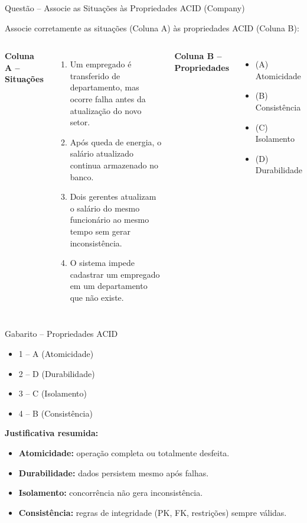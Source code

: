 \documentclass{beamer}
\begin{document}
\begin{frame}{Questão – Associe as Situações às Propriedades ACID (Company)}

Associe corretamente as situações (Coluna A) às propriedades ACID (Coluna B):

\begin{columns}[T]

\textbf{Coluna A – Situações}

\begin{enumerate}
    \item Um empregado é transferido de departamento, mas ocorre falha antes da atualização do novo setor.
    \item Após queda de energia, o salário atualizado continua armazenado no banco.
    \item Dois gerentes atualizam o salário do mesmo funcionário ao mesmo tempo sem gerar inconsistência.
    \item O sistema impede cadastrar um empregado em um departamento que não existe.
\end{enumerate}

\textbf{Coluna B – Propriedades}

\begin{itemize}
    \item (A) Atomicidade
    \item (B) Consistência
    \item (C) Isolamento
    \item (D) Durabilidade
\end{itemize}

\end{columns}

\end{frame}

\begin{frame}{Gabarito – Propriedades ACID}

\begin{itemize}
    \item 1 – A (Atomicidade)
    \item 2 – D (Durabilidade)
    \item 3 – C (Isolamento)
    \item 4 – B (Consistência)
\end{itemize}

\vspace{0.5cm}

\textbf{Justificativa resumida:}

\begin{itemize}
    \item \textbf{Atomicidade:} operação completa ou totalmente desfeita.
    \item \textbf{Durabilidade:} dados persistem mesmo após falhas.
    \item \textbf{Isolamento:} concorrência não gera inconsistência.
    \item \textbf{Consistência:} regras de integridade (PK, FK, restrições) sempre válidas.
\end{itemize}

\end{frame}
\end{document}
